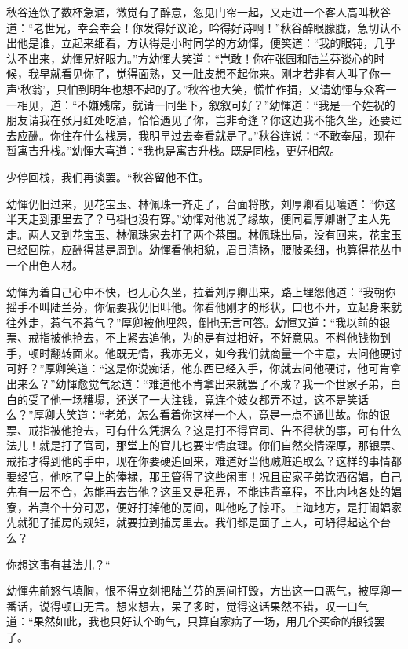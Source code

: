 \documentclass[12pt,UTF8]{ctexbook}
\begin{document}
{{{秋谷连饮了数杯急酒，微觉有了醉意，忽见门帘一起，又走进一个客人高叫秋谷道：“老世兄，幸会幸会！你发得好议论，吟得好诗啊！”秋谷醉眼朦胧，急切认不出他是谁，立起来细看，方认得是小时同学的方幼惲，便笑道：“我的眼钝，几乎认不出来，幼惲兄好眼力。”方幼惲大笑道：“岂敢！你在张园和陆兰芬谈心的时候，我早就看见你了，觉得面熟，又一肚皮想不起你来。刚才若非有人叫了你一声‘秋翁’，只怕到明年也想不起的了。”秋谷也大笑，慌忙作揖，又请幼惲与众客一一相见，道：“不嫌残席，就请一同坐下，叙叙可好？”幼惲道：“我是一个姓祝的朋友请我在张月红处吃酒，恰恰遇见了你，岂非奇逢？你这边我不能久坐，还要过去应酬。你住在什么栈房，我明早过去奉看就是了。”秋谷连说：“不敢奉屈，现在暂寓吉升栈。”幼惲大喜道：“我也是寓吉升栈。既是同栈，更好相叙。

少停回栈，我们再谈罢。“秋谷留他不住。

幼惲仍旧过来，见花宝玉、林佩珠一齐走了，台面将散，刘厚卿看见嚷道：“你这半天走到那里去了？马褂也没有穿。”幼惲对他说了缘故，便同着厚卿谢了主人先走。两人又到花宝玉、林佩珠家去打了两个茶围。林佩珠出局，没有回来，花宝玉已经回院，应酬得甚是周到。幼惲看他相貌，眉目清扬，腰肢柔细，也算得花丛中一个出色人材。

幼惲为着自己心中不快，也无心久坐，拉着刘厚卿出来，路上埋怨他道：“我朝你摇手不叫陆兰芬，你偏要我仍旧叫他。你看他刚才的形状，口也不开，立起身来就往外走，惹气不惹气？”厚卿被他埋怨，倒也无言可答。幼惲又道：“我以前的银票、戒指被他抢去，不上紧去追他，为的是有过相好，不好意思。不料他钱物到手，顿时翻转面来。他既无情，我亦无义，如今我们就商量一个主意，去问他硬讨可好？”厚卿笑道：“这是你说痴话，他东西已经入手，你就去问他硬讨，他可肯拿出来么？”幼惲愈觉气忿道：“难道他不肯拿出来就罢了不成？我一个世家子弟，白白的受了他一场糟塌，还送了一大注钱，竟连个妓女都弄不过，这不是笑话么？”厚卿大笑道：“老弟，怎么看着你这样一个人，竟是一点不通世故。你的银票、戒指被他抢去，可有什么凭据么？这是打不得官司、告不得状的事，可有什么法儿！就是打了官司，那堂上的官儿也要审情度理。你们自然交情深厚，那银票、戒指才得到他的手中，现在你要硬追回来，难道好当他贼赃追取么？这样的事情都要经官，他吃了皇上的俸禄，那里管得了这些闲事！况且宦家子弟饮酒宿娼，自己先有一层不合，怎能再去告他？这里又是租界，不能违背章程，不比内地各处的娼寮，若真个十分可恶，便好打掉他的房间，叫他吃了惊吓。上海地方，是打闹娼家先就犯了捕房的规矩，就要拉到捕房里去。我们都是面子上人，可坍得起这个台么？

你想这事有甚法儿？“

幼惲先前怒气填胸，恨不得立刻把陆兰芬的房间打毁，方出这一口恶气，被厚卿一番话，说得顿口无言。想来想去，呆了多时，觉得这话果然不错，叹一口气道：“果然如此，我也只好认个晦气，只算自家病了一场，用几个买命的银钱罢了。

}}}
\end{document}
